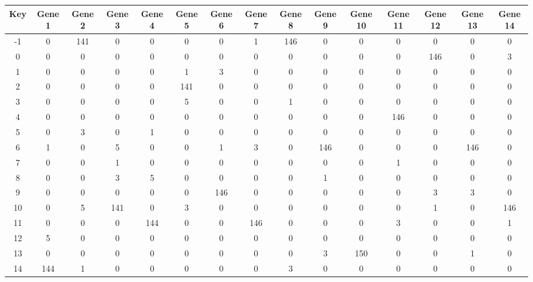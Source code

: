 \begin{tabular}{|c|c|c|c|c|c|c|c|c|c|c|c|c|c|c|}
\hline
Key & Gene 1 & Gene 2 & Gene 3 & Gene 4 & Gene 5 & Gene 6 & Gene 7 & Gene 8 & Gene 9 & Gene 10 & Gene 11 & Gene 12 & Gene 13 & Gene 14 \\
\hline
-1 & 0 & 141 & 0 & 0 & 0 & 0 & 1 & 146 & 0 & 0 & 0 & 0 & 0 & 0 \\
0 & 0 & 0 & 0 & 0 & 0 & 0 & 0 & 0 & 0 & 0 & 0 & 146 & 0 & 3 \\
1 & 0 & 0 & 0 & 0 & 1 & 3 & 0 & 0 & 0 & 0 & 0 & 0 & 0 & 0 \\
2 & 0 & 0 & 0 & 0 & 141 & 0 & 0 & 0 & 0 & 0 & 0 & 0 & 0 & 0 \\
3 & 0 & 0 & 0 & 0 & 5 & 0 & 0 & 1 & 0 & 0 & 0 & 0 & 0 & 0 \\
4 & 0 & 0 & 0 & 0 & 0 & 0 & 0 & 0 & 0 & 0 & 146 & 0 & 0 & 0 \\
5 & 0 & 3 & 0 & 1 & 0 & 0 & 0 & 0 & 0 & 0 & 0 & 0 & 0 & 0 \\
6 & 1 & 0 & 5 & 0 & 0 & 1 & 3 & 0 & 146 & 0 & 0 & 0 & 146 & 0 \\
7 & 0 & 0 & 1 & 0 & 0 & 0 & 0 & 0 & 0 & 0 & 1 & 0 & 0 & 0 \\
8 & 0 & 0 & 3 & 5 & 0 & 0 & 0 & 0 & 1 & 0 & 0 & 0 & 0 & 0 \\
9 & 0 & 0 & 0 & 0 & 0 & 146 & 0 & 0 & 0 & 0 & 0 & 3 & 3 & 0 \\
10 & 0 & 5 & 141 & 0 & 3 & 0 & 0 & 0 & 0 & 0 & 0 & 1 & 0 & 146 \\
11 & 0 & 0 & 0 & 144 & 0 & 0 & 146 & 0 & 0 & 0 & 3 & 0 & 0 & 1 \\
12 & 5 & 0 & 0 & 0 & 0 & 0 & 0 & 0 & 0 & 0 & 0 & 0 & 0 & 0 \\
13 & 0 & 0 & 0 & 0 & 0 & 0 & 0 & 0 & 3 & 150 & 0 & 0 & 1 & 0 \\
14 & 144 & 1 & 0 & 0 & 0 & 0 & 0 & 3 & 0 & 0 & 0 & 0 & 0 & 0 \\
\hline
\end{tabular}